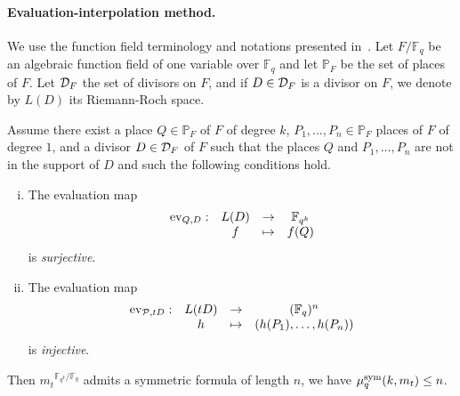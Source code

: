 \documentclass[11pt]{article}
\begin{document}
\paragraph{Evaluation-interpolation method.}
We use the function field terminology and notations
presented in~\cite{Stichtenoth09}. Let $F/\mathbb{F}_q$ be an algebraic
function field of one variable over $\mathbb{F}_{q}$ and let $\mathbb{P}_F$ be the
set of places of $F$. Let $\mathcal{D}_F$ the set of
divisors on $F$, and if $D\in\mathcal{D}_F$ is a divisor on
$F$, we denote by $L(D)$ its Riemann-Roch space.

\begin{prop}
  \label{prop:method}
  Assume there exist a place $Q\in\mathbb{P}_{F}$ of $F$ of degree $k$, $P_1,
  \dots, P_n\in\mathbb{P}_F$ places of $F$ of degree $1$, and a divisor
  $D\in\mathcal{D}_F$ of $F$ such that the places $Q$ and $P_1, \dots, P_n$ are not in
  the support of $D$ and such the following conditions hold.
  \begin{enumerate}[(i)]
    \item \label{cond:1} The evaluation map
      \[
        \begin{array}{cccc}
        \operatorname{ev}_{Q, D}: & L(D) & \to & \mathbb{F}_{q^k}\\
  & f & \mapsto & f(Q)
\end{array}
\]
is \emph{surjective}.
    \item \label{cond:2} The evaluation map
      \[
        \begin{array}{cccc}
        \operatorname{ev}_{\mathcal{P}, tD}: & L(tD) & \to & (\mathbb{F}_{q})^n\\
  & h & \mapsto & (h(P_1), \dots, h(P_n))
\end{array}
\]
is \emph{injective}.
  \end{enumerate}
  Then ${m_t}^{\mathbb{F}_{q^k}/\mathbb{F}_q}$ admits a symmetric formula of length $n$, \ie we have $\mu^{\textrm{sym}}_q(k,m_t)\leq n$.
\end{prop}
\end{document}
